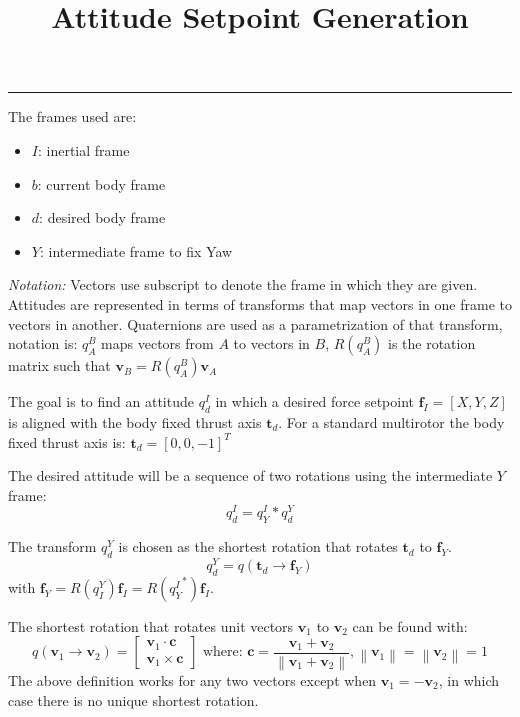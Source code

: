 \documentclass[a4paper]{paper}
\title{Attitude Setpoint Generation}
\begin{document}
\maketitle
\hrule
\bigskip

The frames used are:
\begin{itemize}
    \item $I$: inertial frame
    \item $b$: current body frame
    \item $d$: desired body frame
    \item $Y$: intermediate frame to fix Yaw
\end{itemize}

\textit{Notation:} Vectors use subscript to denote the frame in which they are given. Attitudes are represented in terms of transforms that map vectors in one frame to vectors in another. Quaternions are used as a parametrization of that transform, notation is:
$q_A^B$ maps vectors from $A$ to vectors in $B$, $R(q_A^B)$ is the rotation matrix such that $\bm{v}_B = R(q_A^B)\bm{v}_A$

The goal is to find an attitude $q_d^I$ in which a desired force setpoint $\bm{f}_I = \left[ X, Y, Z \right]$ is aligned with the body fixed thrust axis $\bm{t}_d$.
For a standard multirotor the body fixed thrust axis is: $\bm{t}_d = \left[ 0, 0, -1 \right]^T$

The desired attitude will be a sequence of two rotations using the intermediate $Y$ frame:
\begin{equation}
    q_d^I =  q_Y^I * q_d^Y
\end{equation}

The transform $q_d^Y$ is chosen as the shortest rotation that rotates $\bm{t}_d$ to $\bm{f}_Y$.
\begin{equation}
    q_d^Y = q(\bm{t}_d \rightarrow \bm{f}_Y)
\end{equation}
with $\bm{f}_Y = R(q_I^Y)\bm{f}_I = R({q_Y^I}^*)\bm{f}_I$.

The shortest rotation that rotates unit vectors $\bm{v}_1$ to $\bm{v}_2$ can be found with:
\begin{equation}
    q(\bm{v}_1 \rightarrow \bm{v}_2) =
    \left[\begin{matrix}
        \bm{v}_1 \cdot \bm{c} \\
        \bm{v}_1 \times \bm{c}
    \end{matrix}\right]
    \text{~where:~}
    \bm{c} = \frac{\bm{v}_1 + \bm{v}_2}{\left\lVert\bm{v}_1 + \bm{v}_2\right\rVert}, \left\lVert\bm{v}_1\right\rVert=\left\lVert\bm{v}_2\right\rVert=1
\end{equation}
The above definition works for any two vectors except when $\bm{v}_1 = -\bm{v}_2$, in which case there is no unique shortest rotation.
\end{document}
